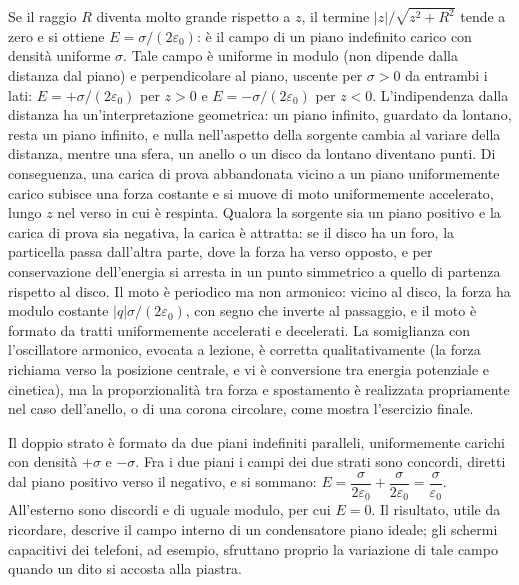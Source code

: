 \documentclass[11pt,a4paper]{article}
\newcommand{\epz}{\varepsilon_0}
\begin{document}
Se il raggio $R$ diventa molto grande rispetto a $z$, il termine $|z|/\sqrt{z^2+R^2}$ tende a zero e si ottiene $E=\sigma/(2\epz)$: è il campo di un piano indefinito carico con densità uniforme $\sigma$. Tale campo è uniforme in modulo (non dipende dalla distanza dal piano) e perpendicolare al piano, uscente per $\sigma>0$ da entrambi i lati: $E=+\sigma/(2\epz)$ per $z>0$ e $E=-\sigma/(2\epz)$ per $z<0$. L'indipendenza dalla distanza ha un'interpretazione geometrica: un piano infinito, guardato da lontano, resta un piano infinito, e nulla nell'aspetto della sorgente cambia al variare della distanza, mentre una sfera, un anello o un disco da lontano diventano punti. Di conseguenza, una carica di prova abbandonata vicino a un piano uniformemente carico subisce una forza costante e si muove di moto uniformemente accelerato, lungo $z$ nel verso in cui è respinta. Qualora la sorgente sia un piano positivo e la carica di prova sia negativa, la carica è attratta: se il disco ha un foro, la particella passa dall'altra parte, dove la forza ha verso opposto, e per conservazione dell'energia si arresta in un punto simmetrico a quello di partenza rispetto al disco. Il moto è periodico ma non armonico: vicino al disco, la forza ha modulo costante $|q|\sigma/(2\epz)$, con segno che inverte al passaggio, e il moto è formato da tratti uniformemente accelerati e decelerati. La somiglianza con l'oscillatore armonico, evocata a lezione, è corretta qualitativamente (la forza richiama verso la posizione centrale, e vi è conversione tra energia potenziale e cinetica), ma la proporzionalità tra forza e spostamento è realizzata propriamente nel caso dell'anello, o di una corona circolare, come mostra l'esercizio finale.

Il doppio strato è formato da due piani indefiniti paralleli, uniformemente carichi con densità $+\sigma$ e $-\sigma$. Fra i due piani i campi dei due strati sono concordi, diretti dal piano positivo verso il negativo, e si sommano: $E=\dfrac{\sigma}{2\epz}+\dfrac{\sigma}{2\epz}=\dfrac{\sigma}{\epz}$. All'esterno sono discordi e di uguale modulo, per cui $E=0$. Il risultato, utile da ricordare, descrive il campo interno di un condensatore piano ideale; gli schermi capacitivi dei telefoni, ad esempio, sfruttano proprio la variazione di tale campo quando un dito si accosta alla piastra.
\end{document}
